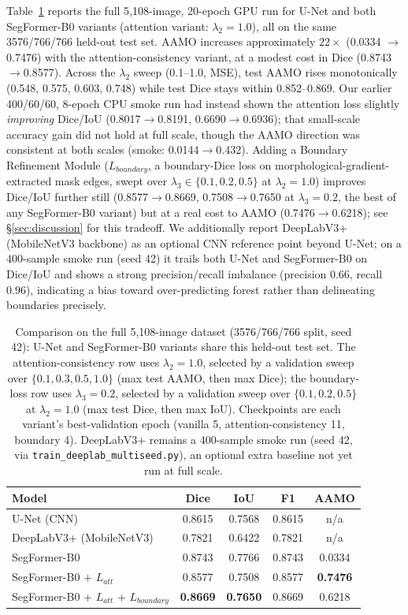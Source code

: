 \documentclass[sigconf,review]{acmart}
\begin{document}
Table~\ref{tab:results} reports the full 5{,}108-image, 20-epoch GPU run for
U-Net and both SegFormer-B0 variants (attention variant: $\lambda_2{=}1.0$),
all on the same 3576/766/766 held-out test set. AAMO increases approximately
$22\times$ (0.0334 $\to$ 0.7476) with the attention-consistency variant, at a
modest cost in Dice (0.8743$\to$0.8577). Across the
$\lambda_2$ sweep (0.1--1.0, MSE), test AAMO rises monotonically (0.548,
0.575, 0.603, 0.748) while test Dice stays within 0.852--0.869.
Our earlier 400/60/60, 8-epoch CPU smoke run had instead shown the attention
loss slightly \emph{improving} Dice/IoU
(0.8017$\to$0.8191, 0.6690$\to$0.6936); that small-scale accuracy gain did
not hold at full scale, though the AAMO direction was consistent at both
scales (smoke: 0.0144$\to$0.432). Adding a Boundary Refinement Module
($L_{boundary}$, a boundary-Dice loss on morphological-gradient-extracted
mask edges, swept over $\lambda_3 \in \{0.1, 0.2, 0.5\}$ at
$\lambda_2{=}1.0$) improves Dice/IoU further still (0.8577$\to$0.8669,
0.7508$\to$0.7650 at $\lambda_3{=}0.2$, the best of any SegFormer-B0
variant) but at a real cost to AAMO (0.7476$\to$0.6218); see
\S\ref{sec:discussion} for this tradeoff. We additionally report
DeepLabV3+ (MobileNetV3 backbone) as an optional CNN reference point beyond
U-Net; on a 400-sample smoke run (seed 42) it trails both U-Net and
SegFormer-B0 on Dice/IoU and shows a strong precision/recall imbalance
(precision 0.66, recall 0.96), indicating a bias toward over-predicting
forest rather than delineating boundaries precisely.

\begin{table}[t]
\caption{Comparison on the full 5{,}108-image dataset (3576/766/766 split,
seed 42): U-Net and SegFormer-B0 variants share this held-out test set. The
attention-consistency row uses $\lambda_2{=}1.0$, selected by a validation
sweep over $\{0.1, 0.3, 0.5, 1.0\}$ (max test AAMO, then max Dice); the
boundary-loss row uses $\lambda_3{=}0.2$, selected by a validation sweep
over $\{0.1, 0.2, 0.5\}$ at $\lambda_2{=}1.0$ (max test Dice, then max
IoU). Checkpoints are each variant's best-validation epoch (vanilla 5,
attention-consistency 11, boundary 4). DeepLabV3+ remains a 400-sample
smoke run (seed 42, via \texttt{train\_deeplab\_multiseed.py}), an optional
extra baseline not yet run at full scale.}
\label{tab:results}
\begin{tabular}{@{}lccc c@{}}
\toprule
Model & Dice & IoU & F1 & AAMO \\
\midrule
U-Net (CNN) & 0.8615 & 0.7568 & 0.8615 & n/a \\
DeepLabV3+ (MobileNetV3) & 0.7821 & 0.6422 & 0.7821 & n/a \\
SegFormer-B0 & 0.8743 & 0.7766 & 0.8743 & 0.0334 \\
SegFormer-B0 + $L_{att}$ & 0.8577 & 0.7508 & 0.8577 & \textbf{0.7476} \\
SegFormer-B0 + $L_{att}$ + $L_{boundary}$ & \textbf{0.8669} & \textbf{0.7650} & 0.8669 & 0.6218 \\
\bottomrule
\end{tabular}
\end{table}
\end{document}

